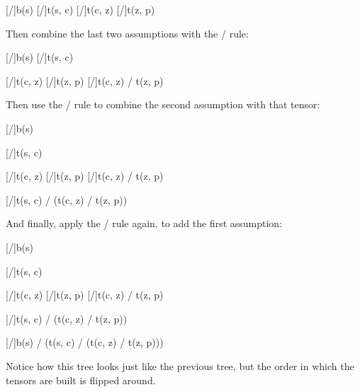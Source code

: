 \documentclass[../../../main.tex]{subfiles}
\begin{document}
\begin{prooftree*}
  \hypo{}
  [\startrule/]{b(s)}
  \hypo{}
  [\startrule/]{t(s, c)}
  \hypo{}
  [\startrule/]{t(c, z)}
  \hypo{}
  [\startrule/]{t(z, p)}
\end{prooftree*}

\noindent
Then combine the last two assumptions with the \tensorIntro/ rule:

\begin{prooftree*}
  \hypo{}
  [\startrule/]{b(s)}
  \hypo{}
  [\startrule/]{t(s, c)}

  \hypo{}
  [\startrule/]{t(c, z)}
  \hypo{}
  [\startrule/]{t(z, p)}
  [\tensorIntro/]{t(c, z) \tensor/ t(z, p)}
  
\end{prooftree*}

\noindent
Then use the \tensorIntro/ rule to combine the second assumption with that tensor:

\begin{prooftree*}
  \hypo{}
  [\startrule/]{b(s)}

  \hypo{}
  [\startrule/]{t(s, c)}

  \hypo{}
  [\startrule/]{t(c, z)}
  \hypo{}
  [\startrule/]{t(z, p)}
  [\tensorIntro/]{t(c, z) \tensor/ t(z, p)}

  [\tensorIntro/]{t(s, c) \tensor/ (t(c, z) \tensor/ t(z, p))}
  
\end{prooftree*}

\noindent
And finally, apply the \tensorIntro/ rule again, to add the first assumption:

\begin{prooftree*}
  \hypo{}
  [\startrule/]{b(s)}

  \hypo{}
  [\startrule/]{t(s, c)}

  \hypo{}
  [\startrule/]{t(c, z)}
  \hypo{}
  [\startrule/]{t(z, p)}
  [\tensorIntro/]{t(c, z) \tensor/ t(z, p)}

  [\tensorIntro/]{t(s, c) \tensor/ (t(c, z) \tensor/ t(z, p))}
  
  [\tensorIntro/]{b(s) \tensor/ (t(s, c) \tensor/ (t(c, z) \tensor/ t(z, p)))}
\end{prooftree*}

\noindent
Notice how this tree looks just like the previous tree, but the order in which the tensors are built is flipped around.
\end{document}
